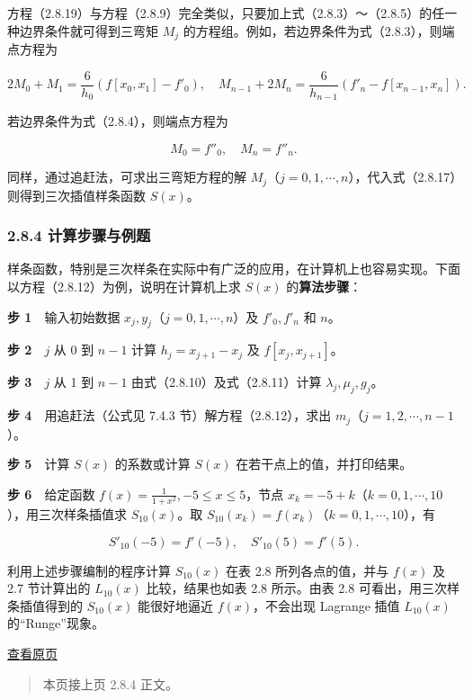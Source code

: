 \documentclass[
  10pt,
  fontset=fandol]{ctexart}
\begin{document}
方程（2.8.19）与方程（2.8.9）完全类似，只要加上式（2.8.3）～（2.8.5）的任一种边界条件就可得到三弯矩 \(M_j\) 的方程组。例如，若边界条件为式（2.8.3），则端点方程为

\[2M_0+M_1=\frac6{h_0}(f[x_0,x_1]-f'_0),\quad M_{n-1}+2M_n=\frac6{h_{n-1}}(f'_n-f[x_{n-1},x_n]).\]

若边界条件为式（2.8.4），则端点方程为

\[M_0=f''_0,\quad M_n=f''_n.\]

同样，通过追赶法，可求出三弯矩方程的解 \(M_j\)（\(j=0,1,\cdots,n\)），代入式（2.8.17）则得到三次插值样条函数 \(S(x)\)。

\subsubsection{2.8.4 计算步骤与例题}\label{ux8ba1ux7b97ux6b65ux9aa4ux4e0eux4f8bux9898}

样条函数，特别是三次样条在实际中有广泛的应用，在计算机上也容易实现。下面以方程（2.8.12）为例，说明在计算机上求 \(S(x)\) 的\textbf{算法步骤}：

\textbf{步 1}　输入初始数据 \(x_j,y_j\)（\(j=0,1,\cdots,n\)）及 \(f'_0,f'_n\) 和 \(n\)。

\textbf{步 2}　\(j\) 从 0 到 \(n-1\) 计算 \(h_j=x_{j+1}-x_j\) 及 \(f[x_j,x_{j+1}]\)。

\textbf{步 3}　\(j\) 从 1 到 \(n-1\) 由式（2.8.10）及式（2.8.11）计算 \(\lambda_j,\mu_j,g_j\)。

\textbf{步 4}　用追赶法（公式见 7.4.3 节）解方程（2.8.12），求出 \(m_j\)（\(j=1,2,\cdots,n-1\)）。

\textbf{步 5}　计算 \(S(x)\) 的系数或计算 \(S(x)\) 在若干点上的值，并打印结果。

\textbf{步 6}　给定函数 \(f(x)=\frac1{1+x^2},-5\leqslant x\leqslant5\)，节点 \(x_k=-5+k\)（\(k=0,1,\cdots,10\)），用三次样条插值求 \(S_{10}(x)\)。取 \(S_{10}(x_k)=f(x_k)\)（\(k=0,1,\cdots,10\)），有

\[S'_{10}(-5)=f'(-5),\quad S'_{10}(5)=f'(5).\]

利用上述步骤编制的程序计算 \(S_{10}(x)\) 在表 2.8 所列各点的值，并与 \(f(x)\) 及 2.7 节计算出的 \(L_{10}(x)\) 比较，结果也如表 2.8 所示。由表 2.8 可看出，用三次样条插值得到的 \(S_{10}(x)\) 能很好地逼近 \(f(x)\)，不会出现 Lagrange 插值 \(L_{10}(x)\) 的``Runge''现象。

\href{../../source-images/pdf-054.jpeg}{查看原页}

\begin{quote}
本页接上页 2.8.4 正文。
\end{quote}
\end{document}
